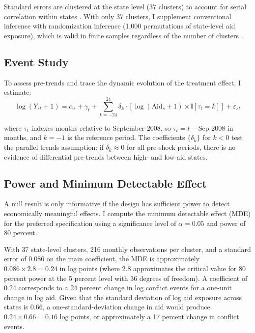 \documentclass[12pt]{article}
\newcommand{\ind}{\mathbb{I}}
\begin{document}
Standard errors are clustered at the state level (37 clusters) to account for serial correlation within states \citep{bertrand2004how}. With only 37 clusters, I supplement conventional inference with randomization inference (1,000 permutations of state-level aid exposure), which is valid in finite samples regardless of the number of clusters \citep{young2019channeling, conley2011inference}.

\subsection{Event Study}

To assess pre-trends and trace the dynamic evolution of the treatment effect, I estimate:
\begin{equation}
\log(Y_{st} + 1) = \alpha_s + \gamma_t + \sum_{k=-24}^{24} \delta_k \cdot [\log(\text{Aid}_s + 1) \times \ind[\tau_t = k]] + \varepsilon_{st}
\label{eq:eventstudy}
\end{equation}

\noindent where $\tau_t$ indexes months relative to September 2008, so $\tau_t = t - \text{Sep 2008}$ in months, and $k = -1$ is the reference period. The coefficients $\{\delta_k\}$ for $k < 0$ test the parallel trends assumption: if $\delta_k \approx 0$ for all pre-shock periods, there is no evidence of differential pre-trends between high- and low-aid states.

\subsection{Power and Minimum Detectable Effect}

A null result is only informative if the design has sufficient power to detect economically meaningful effects. I compute the minimum detectable effect (MDE) for the preferred specification using a significance level of $\alpha = 0.05$ and power of 80 percent.

With 37 state-level clusters, 216 monthly observations per cluster, and a standard error of 0.086 on the main coefficient, the MDE is approximately $0.086 \times 2.8 = 0.24$ in log points (where 2.8 approximates the critical value for 80 percent power at the 5 percent level with 36 degrees of freedom). A coefficient of 0.24 corresponds to a 24 percent change in log conflict events for a one-unit change in log aid. Given that the standard deviation of log aid exposure across states is 0.66, a one-standard-deviation change in aid would produce $0.24 \times 0.66 = 0.16$ log points, or approximately a 17 percent change in conflict events.
\end{document}
